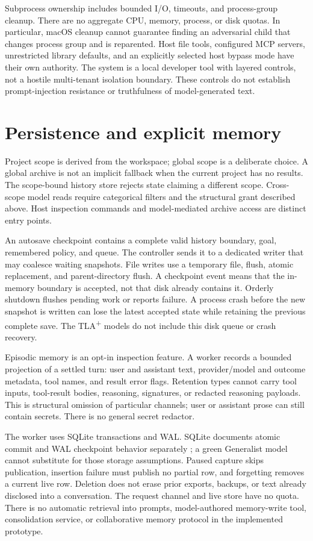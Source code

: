\documentclass[10pt,letterpaper]{article}
\newcommand{\tla}{TLA\textsuperscript{+}}
\begin{document}
Subprocess ownership includes bounded I/O, timeouts, and process-group cleanup.
There are no aggregate CPU, memory, process, or disk quotas. In particular,
macOS cleanup cannot guarantee finding an adversarial child that changes
process group and is reparented. Host file tools, configured MCP servers,
unrestricted library defaults, and an explicitly selected host bypass mode
have their own authority. The system is a local developer tool with layered
controls, not a hostile multi-tenant isolation boundary. These controls do not
establish prompt-injection resistance or truthfulness of model-generated text.

\section{Persistence and explicit memory}
Project scope is derived from the workspace; global scope is a deliberate
choice. A global archive is not an implicit fallback when the current project
has no results. The scope-bound history store rejects state claiming a
different scope. Cross-scope model reads require categorical filters and the
structural grant described above. Host inspection commands and model-mediated
archive access are distinct entry points.

An autosave checkpoint contains a complete valid history boundary, goal,
remembered policy, and queue. The controller sends it to a dedicated writer
that may coalesce waiting snapshots. File writes use a temporary file, flush,
atomic replacement, and parent-directory flush. A checkpoint event means that
the in-memory boundary is accepted, not that disk already contains it. Orderly
shutdown flushes pending work or reports failure. A process crash before the
new snapshot is written can lose the latest accepted state while retaining the
previous complete save. The \tla{} models do not include this disk queue or
crash recovery.

Episodic memory is an opt-in inspection feature. A worker records a bounded
projection of a settled turn: user and assistant text, provider/model and
outcome metadata, tool names, and result error flags. Retention types cannot
carry tool inputs, tool-result bodies, reasoning, signatures, or redacted
reasoning payloads. This is structural omission of particular channels; user
or assistant prose can still contain secrets. There is no general secret
redactor.

The worker uses SQLite transactions and WAL. SQLite documents atomic commit
and WAL checkpoint behavior separately \cite{sqliteatomic,sqlitewal}; a green
Generalist model cannot substitute for those storage assumptions. Paused
capture skips publication, insertion failure must publish no partial row, and
forgetting removes a current live row. Deletion does not erase prior exports,
backups, or text already disclosed into a conversation. The request channel
and live store have no quota. There is no automatic retrieval into prompts,
model-authored memory-write tool, consolidation service, or collaborative
memory protocol in the implemented prototype.
\end{document}
